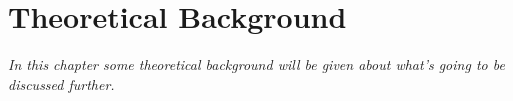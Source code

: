 
\chapter{Theoretical Background}
\label{cap:theoretical}

\textit{In this chapter some theoretical background will be given about what's going to be discussed further.}


\cleardoublepage
